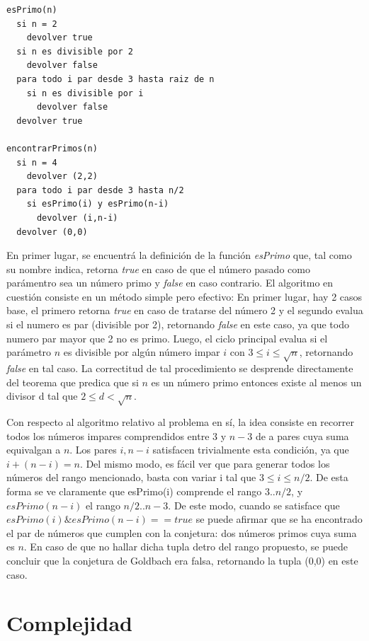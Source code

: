 \documentclass[a4paper,10pt] {article}
\begin{document}
\begin{verbatim}
esPrimo(n)
  si n = 2 
    devolver true
  si n es divisible por 2
    devolver false
  para todo i par desde 3 hasta raiz de n
    si n es divisible por i
      devolver false
  devolver true

encontrarPrimos(n)
  si n = 4
    devolver (2,2)
  para todo i par desde 3 hasta n/2
    si esPrimo(i) y esPrimo(n-i)
      devolver (i,n-i)
  devolver (0,0)
\end{verbatim}

En primer lugar, se encuentr\'a la definici\'on de la funci\'on \textit{esPrimo}
que, tal como su nombre indica, retorna \textit{true} en caso de que el n\'umero
pasado como par\'amentro sea un n\'umero primo y \textit{false} en caso
contrario. El algoritmo en cuesti\'on consiste en un m\'etodo simple pero
efectivo: En primer lugar, hay 2 casos base, el primero retorna \textit{true} en caso de
tratarse del n\'umero 2 y el segundo evalua si el numero es par (divisible por
2), retornando \textit{false} en este caso, ya que todo numero par mayor que 2
no es primo. Luego, el ciclo principal evalua si el par\'ametro $n$ es divisible
por alg\'un n\'umero impar $i$ con $3 \leq i \leq \sqrt{n}$, retornando
\textit{false} en tal caso. La correctitud de tal procedimiento se desprende
directamente del teorema que predica que si $n$ es un n\'umero primo entonces
existe al menos un divisor d tal que $2 \leq d < \sqrt{n}$.

Con respecto al algoritmo relativo al problema en s\'i, la idea consiste en
recorrer todos los n\'umeros impares comprendidos entre $3$ y $n-3$ de a pares
cuya suma equivalgan a $n$. Los pares $i, n - i$ satisfacen trivialmente esta condici\'on, ya que $i + (n-i) = n$. Del mismo modo, es f\'acil ver que para generar todos los n\'umeros del rango mencionado, basta con variar i tal que $3 \le i \le n/2$. De esta forma se ve claramente que esPrimo(i) comprende el rango $3..n/2$, y $esPrimo(n-i)$ el rango $n/2..n-3$. De este modo, cuando se satisface que $esPrimo(i) \& esPrimo(n-i) == true$ se puede afirmar que se ha encontrado el par de n\'umeros que cumplen con la conjetura: dos n\'umeros primos cuya suma es $n$. En caso de que no hallar dicha tupla detro del rango propuesto, se puede concluir que la conjetura de Goldbach era falsa, retornando la tupla (0,0) en este caso.  

\section*{Complejidad}
\end{document}

